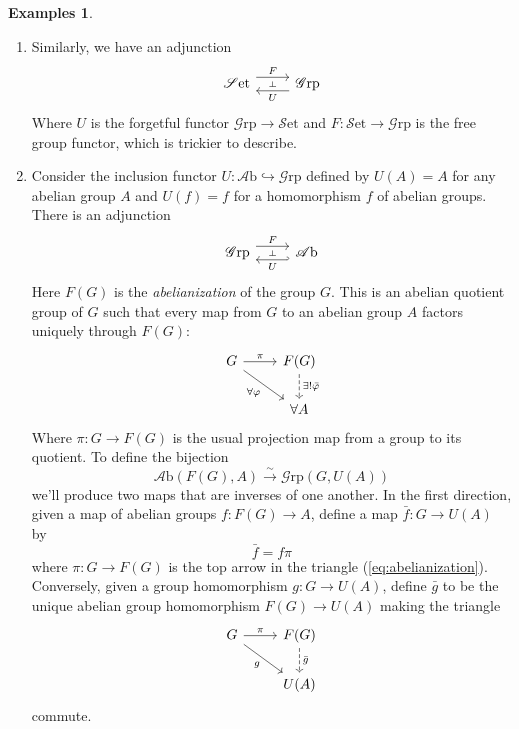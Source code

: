 \documentclass[10pt,oneside]{book}
\def\~#1{\mathscr{#1}}
\newcommand{\isom}{\xrightarrow{\sim}}
\newcommand{\mono}{\hookrightarrow}
\newcommand{\Set}{\~S\mathrm{et}}
\newcommand{\Grp}{\~G\mathrm{rp}}
\newcommand{\Ab}{\~A\mathrm{b}}
\theoremstyle{plain}
\theoremstyle{definition}
\newtheorem{exs}[thm]{Examples}
\theoremstyle{remark}
\numberwithin{equation}{section}
\numberwithin{figure}{section}
\begin{document}
\begin{exs}
\begin{enumerate}[label=(\roman*)]
        \item Similarly, we have an adjunction 
        \[\begin{tikzcd}
            {\Set} & {\Grp}
            \arrow[""{name=0, anchor=center, inner sep=0}, "F", shift left=2, from=1-1, to=1-2]
            \arrow[""{name=1, anchor=center, inner sep=0}, "U", shift left=2, from=1-2, to=1-1]
            \arrow["\dashv"{anchor=center, rotate=-90}, draw=none, from=0, to=1]
        \end{tikzcd}\]
        Where $U$ is the forgetful functor $\Grp \to \Set$ and $F: \Set \to \Grp$ is the free group functor, which is trickier to describe.

        \item Consider the inclusion functor $U: \Ab \mono \Grp$ defined by $U(A) = A$ for any abelian group $A$ and $U(f) = f$ for a homomorphism $f$ of abelian groups. There is an adjunction
        \[\begin{tikzcd}
            {\Grp} & {\Ab}
            \arrow[""{name=0, anchor=center, inner sep=0}, "F", shift left=2, from=1-1, to=1-2]
            \arrow[""{name=1, anchor=center, inner sep=0}, "U", shift left=2, from=1-2, to=1-1, hook']
            \arrow["\dashv"{anchor=center, rotate=-90}, draw=none, from=0, to=1]
        \end{tikzcd}\]
        Here $F(G)$ is the \emph{abelianization} of the group $G$. This is an abelian quotient group of $G$ such that every map from $G$ to an abelian group $A$ factors uniquely through $F(G)$:
        \begin{equation}
        \label{eq:abelianization}
        \begin{tikzcd}
            G & {F(G)} \\
            & {\forall A}
            \arrow["\pi", from=1-1, to=1-2]
            \arrow["{\forall \varphi}"', from=1-1, to=2-2]
            \arrow["{\exists! \bar{\varphi}}", dashed, from=1-2, to=2-2]
        \end{tikzcd}
        \end{equation}
        Where $\pi: G \to F(G)$ is the usual projection map from a group to its quotient. To define the bijection 
        \[\Ab(F(G), A) \isom \Grp(G, U(A))\]
        we'll produce two maps that are inverses of one another. In the first direction, given a map of abelian groups $f: F(G) \to A$, define a map $\bar{f}: G \to U(A)$ by
        \[\bar{f} = f \pi\]
        where $\pi: G \to F(G)$ is the top arrow in the triangle (\ref{eq:abelianization}). Conversely, given a group homomorphism $g: G \to U(A)$, define $\bar{g}$ to be the unique abelian group homomorphism $F(G) \to U(A)$ making the triangle
        \[\begin{tikzcd}
            G & {F(G)} \\
            & {U(A)}
            \arrow["\pi", from=1-1, to=1-2]
            \arrow["{g}"', from=1-1, to=2-2]
            \arrow["{\bar{g}}", dashed, from=1-2, to=2-2]
        \end{tikzcd}\]
        commute. 


\end{enumerate}
\end{exs}
\end{document}
